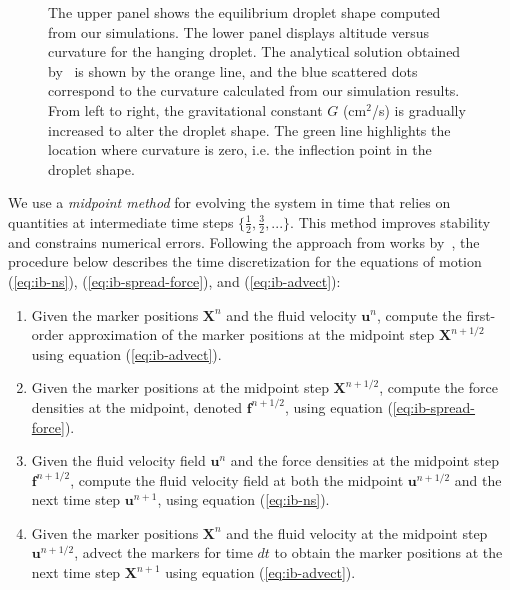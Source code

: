 \documentclass[%
 aip,
 amsmath,amssymb,
 reprint,
 floatfix
]{revtex4-1}
\begin{document}
\begin{figure*}
\caption{\footnotesize{The upper panel shows the equilibrium droplet shape computed from our simulations. The lower panel displays altitude versus curvature for the hanging droplet. The analytical solution obtained by~\citet{cimpeanu2021motion} is shown by the orange line, and the blue scattered dots correspond to the curvature calculated from our simulation results. From left to right, the gravitational constant $G$ (cm$^2$/s) is gradually increased to alter the droplet shape. The green line highlights the location where curvature is zero, i.e. the inflection point in the droplet shape.}}
\label{fig:h-curvature}
\end{figure*}

We use a \textit{midpoint method} for evolving the system in time that relies on quantities at intermediate time steps $\{\frac{1}{2}, \frac{3}{2}, ...\}$. This method improves stability and constrains numerical errors. Following the approach from works by~\citet{peskin2002immersed,ib_matlab}, the procedure below describes the time discretization for the equations of motion (\ref{eq:ib-ns}), (\ref{eq:ib-spread-force}), and (\ref{eq:ib-advect}): 
\begin{enumerate}
    \item Given the marker positions $\bm{X}^n$ and the fluid velocity $\bm{u}^n$, compute the first-order approximation of the marker positions at the midpoint step $\bm{X}^{n + 1/2}$ using equation (\ref{eq:ib-advect}). 
    \item Given the marker positions at the midpoint step $\bm{X}^{n + 1/2}$, compute the force densities at the midpoint, denoted $\bm{f}^{n + 1/2}$, using equation (\ref{eq:ib-spread-force}). 
    \item Given the fluid velocity field $\bm{u}^n$ and the force densities at the midpoint step $\bm{f}^{n + 1/2}$, compute the fluid velocity field at both the midpoint $\bm{u}^{n + 1/2}$ and the next time step $\bm{u}^{n + 1}$, using equation (\ref{eq:ib-ns}). 
    \item Given the marker positions $\bm{X}^n$ and the fluid velocity at the midpoint step $\bm{u}^{n + 1/2}$, advect the markers for time $dt$ to obtain the marker positions at the next time step $\bm{X}^{n + 1}$ using equation (\ref{eq:ib-advect}). 
\end{enumerate}
\end{document}
